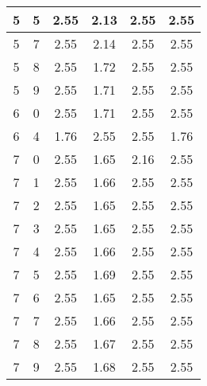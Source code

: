 \begin{longtable}{|c|c||c||c|c||c|}
	5 & 5 & 2.55 & 2.13 & 2.55 & 2.55 \\ \hline
	5 & 7 & 2.55 & 2.14 & 2.55 & 2.55 \\ \hline
	5 & 8 & 2.55 & 1.72 & 2.55 & 2.55 \\ \hline
	5 & 9 & 2.55 & 1.71 & 2.55 & 2.55 \\ \hline
	6 & 0 & 2.55 & 1.71 & 2.55 & 2.55 \\ \hline
	6 & 4 & 1.76 & 2.55 & 2.55 & 1.76 \\ \hline
	7 & 0 & 2.55 & 1.65 & 2.16 & 2.55 \\ \hline
	7 & 1 & 2.55 & 1.66 & 2.55 & 2.55 \\ \hline
	7 & 2 & 2.55 & 1.65 & 2.55 & 2.55 \\ \hline
	7 & 3 & 2.55 & 1.65 & 2.55 & 2.55 \\ \hline
	7 & 4 & 2.55 & 1.66 & 2.55 & 2.55 \\ \hline
	7 & 5 & 2.55 & 1.69 & 2.55 & 2.55 \\ \hline
	7 & 6 & 2.55 & 1.65 & 2.55 & 2.55 \\ \hline
	7 & 7 & 2.55 & 1.66 & 2.55 & 2.55 \\ \hline
	7 & 8 & 2.55 & 1.67 & 2.55 & 2.55 \\ \hline
	7 & 9 & 2.55 & 1.68 & 2.55 & 2.55 \\ \hline
\end{longtable}
\clearpage{}
